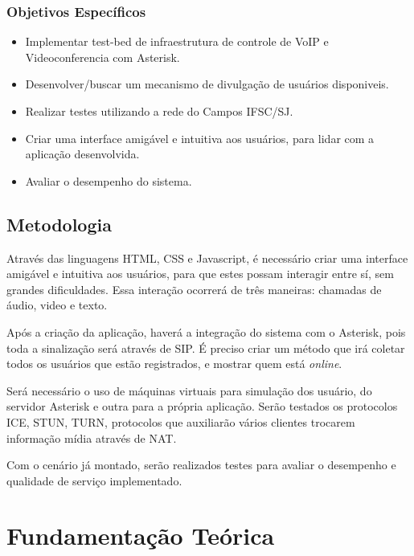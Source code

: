\documentclass[ruledheader]{abnt} %
\begin{document}
\subsection{Objetivos Específicos}
\label{ss_objEspecicos}

\begin{itemize} %
 \item Implementar test-bed de infraestrutura de controle de VoIP e Videoconferencia com Asterisk.
 \item Desenvolver/buscar um mecanismo de divulgação de usuários disponiveis.
 \item Realizar testes utilizando a rede do Campos IFSC/SJ.
 \item Criar uma interface amigável e intuitiva aos usuários, para lidar com a aplicação desenvolvida.
 \item Avaliar o desempenho do sistema.
\end{itemize}


\section{Metodologia}
\label{s_metodologia} %

Através das linguagens HTML, CSS e Javascript, é necessário criar uma interface amigável e intuitiva aos usuários, para que estes possam interagir entre sí, sem grandes dificuldades. Essa interação ocorrerá de três maneiras: chamadas de áudio, video e texto.

Após a criação da aplicação, haverá a integração do sistema com o Asterisk, pois toda a sinalização será através de SIP. É preciso criar um método que irá coletar todos os usuários que estão registrados, e mostrar quem está \textit{online}.

Será necessário o uso de máquinas virtuais para simulação dos usuário, do servidor Asterisk e outra para a própria aplicação. Serão testados os protocolos ICE, STUN, TURN, protocolos que auxiliarão vários clientes trocarem informação mídia através de NAT.

Com o cenário já montado, serão realizados testes para avaliar o desempenho e qualidade de serviço implementado.


\chapter{Fundamentação Teórica} %
\label{c_fundamentacaoTeorica} %
\end{document}
